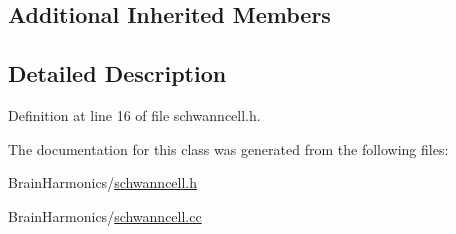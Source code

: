 \subsection*{Additional Inherited Members}


\subsection{Detailed Description}


Definition at line 16 of file schwanncell.\+h.



The documentation for this class was generated from the following files\+:\begin{DoxyCompactItemize}
\item 
Brain\+Harmonics/\hyperlink{schwanncell_8h}{schwanncell.\+h}\item 
Brain\+Harmonics/\hyperlink{schwanncell_8cc}{schwanncell.\+cc}\end{DoxyCompactItemize}
